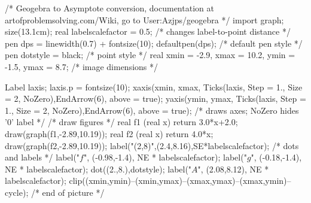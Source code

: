 \documentclass[10pt,a4paper]{article}
\author{Germán Avendaño Ramírez}
\begin{document}
 /* Geogebra to Asymptote conversion, documentation at artofproblemsolving.com/Wiki, go to User:Azjps/geogebra */
import graph; size(13.1cm); 
real labelscalefactor = 0.5; /* changes label-to-point distance */
pen dps = linewidth(0.7) + fontsize(10); defaultpen(dps); /* default pen style */ 
pen dotstyle = black; /* point style */ 
real xmin = -2.9, xmax = 10.2, ymin = -1.5, ymax = 8.7;  /* image dimensions */

Label laxis; laxis.p = fontsize(10); 
xaxis(xmin, xmax, Ticks(laxis, Step = 1., Size = 2, NoZero),EndArrow(6), above = true); 
yaxis(ymin, ymax, Ticks(laxis, Step = 1., Size = 2, NoZero),EndArrow(6), above = true); /* draws axes; NoZero hides '0' label */ 
 /* draw figures */
real f1 (real x) {return 3.0*x+2.0;} 
draw(graph(f1,-2.89,10.19)); 
real f2 (real x) {return 4.0*x;} 
draw(graph(f2,-2.89,10.19)); 
label("(2,8)",(2.4,8.16),SE*labelscalefactor); 
 /* dots and labels */
label("$f$", (-0.98,-1.4), NE * labelscalefactor); 
label("$g$", (-0.18,-1.4), NE * labelscalefactor); 
dot((2.,8.),dotstyle); 
label("$A$", (2.08,8.12), NE * labelscalefactor); 
clip((xmin,ymin)--(xmin,ymax)--(xmax,ymax)--(xmax,ymin)--cycle); 
 /* end of picture */
\end{document}
